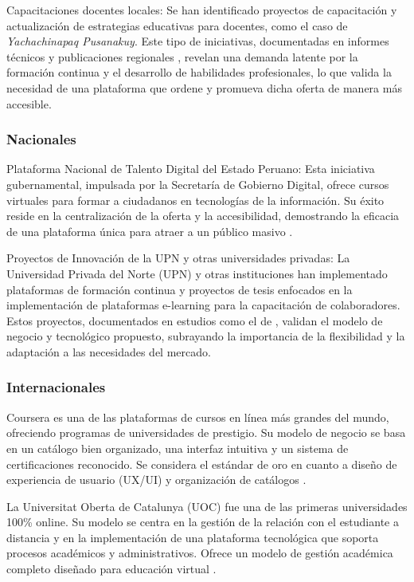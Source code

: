 Capacitaciones docentes locales: Se han identificado proyectos de capacitación y actualización de estrategias educativas para docentes, como el caso de \textit{Yachachinapaq Pusanakuy}. Este tipo de iniciativas, documentadas en informes técnicos y publicaciones regionales \citep{garcia2020}, revelan una demanda latente por la formación continua y el desarrollo de habilidades profesionales, lo que valida la necesidad de una plataforma que ordene y promueva dicha oferta de manera más accesible.


\subsubsection{Nacionales}
Plataforma Nacional de Talento Digital del Estado Peruano: Esta iniciativa gubernamental, impulsada por la Secretaría de Gobierno Digital, ofrece cursos virtuales para formar a ciudadanos en tecnologías de la información. Su éxito reside en la centralización de la oferta y la accesibilidad, demostrando la eficacia de una plataforma única para atraer a un público masivo \citep{pcm2022}.

Proyectos de Innovación de la UPN y otras universidades privadas: La Universidad Privada del Norte (UPN) y otras instituciones han implementado plataformas de formación continua y proyectos de tesis enfocados en la implementación de plataformas e-learning para la capacitación de colaboradores. Estos proyectos, documentados en estudios como el de \citep{ramos2021}, validan el modelo de negocio y tecnológico propuesto, subrayando la importancia de la flexibilidad y la adaptación a las necesidades del mercado.


\subsubsection{Internacionales}
Coursera es una de las plataformas de cursos en línea más grandes del mundo, ofreciendo programas de universidades de prestigio. 
Su modelo de negocio se basa en un catálogo bien organizado, una interfaz intuitiva y un sistema de certificaciones reconocido. 
Se considera el estándar de oro en cuanto a diseño de experiencia de usuario (UX/UI) y organización de catálogos \citep{gupta2020}.

La Universitat Oberta de Catalunya (UOC) fue una de las primeras universidades 100\% online. 
Su modelo se centra en la gestión de la relación con el estudiante a distancia y en la implementación de una plataforma tecnológica que soporta procesos académicos y administrativos. 
Ofrece un modelo de gestión académica completo diseñado para educación virtual \citep{uoc2023}.

